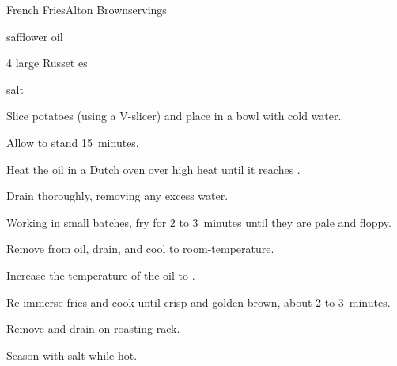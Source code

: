 \begin{recipe}{French Fries}{Alton Brown}{servings}


\begin{ingredients}
\item {} safflower oil
\item 4 large Russet es
\item salt
\end{ingredients}

\begin{directions}
\item Slice potatoes (using a V-slicer) and place in a bowl with cold water.
\item Allow to stand 15~minutes.
\item Heat the oil in a Dutch oven over high heat until it reaches .
\item Drain thoroughly, removing any excess water.
\item Working in small batches, fry for 2 to 3~minutes until they are pale and floppy.
\item Remove from oil, drain, and cool to room-temperature.
\item Increase the temperature of the oil to .
\item Re-immerse fries and cook until crisp and golden brown, about 2 to 3~minutes.
\item Remove and drain on roasting rack.
\item Season with salt while hot.
\end{directions}

\end{recipe}
